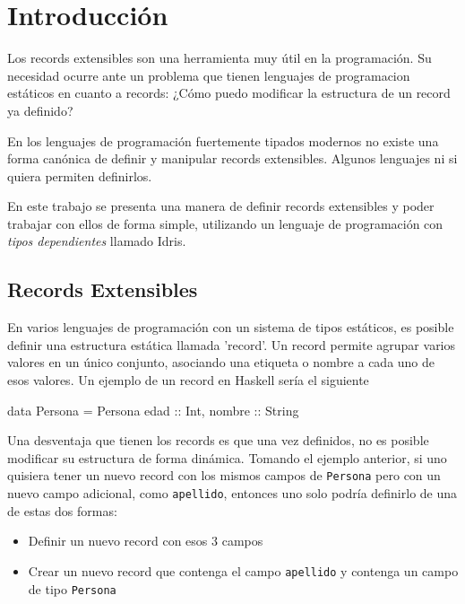 
\chapter{Introducción}
\label{ch:1}

Los records extensibles son una herramienta muy útil en la programación. Su necesidad ocurre ante un problema que tienen lenguajes de programacion estáticos en cuanto a records: ¿Cómo puedo modificar la estructura de un record ya definido?

En los lenguajes de programación fuertemente tipados modernos no existe una forma canónica de definir y manipular records extensibles. Algunos lenguajes ni si quiera permiten definirlos.

En este trabajo se presenta una manera de definir records extensibles y poder trabajar con ellos de forma simple, utilizando un lenguaje de programación con \textit{tipos dependientes} llamado Idris.

\section{Records Extensibles}

En varios lenguajes de programación con un sistema de tipos estáticos, es posible definir una estructura estática llamada 'record'. Un record permite agrupar varios valores en un único conjunto, asociando una etiqueta o nombre a cada uno de esos valores.
Un ejemplo de un record en Haskell sería el siguiente

\begin{code}
data Persona = Persona { edad :: Int, nombre :: String}
\end{code}

Una desventaja que tienen los records es que una vez definidos, no es posible modificar su estructura de forma dinámica. Tomando el ejemplo anterior, si uno quisiera tener un nuevo record con los mismos campos de \texttt{Persona} pero con un nuevo campo adicional, como \texttt{apellido}, entonces uno solo podría definirlo de una de estas dos formas:
\begin{itemize}[noitemsep]
\item Definir un nuevo record con esos 3 campos
\item Crear un nuevo record que contenga el campo \texttt{apellido} y contenga un campo de tipo \texttt{Persona}
\end{itemize}

